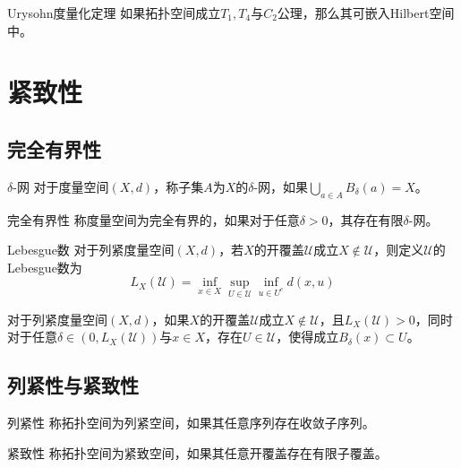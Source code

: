 \documentclass[lang = cn, scheme = chinese, thmcnt = section, usesamecnt]{elegantbook}
\newcommand{\sub}{\subset}             %
\begin{document}
\begin{theorem}{Urysohn度量化定理}
	如果拓扑空间成立$T_1,T_4$与$C_2$公理，那么其可嵌入Hilbert空间中。
\end{theorem}

\section{紧致性}

\subsection{完全有界性}

\begin{definition}{$\delta$-网}
	对于度量空间$(X,d)$，称子集$A$为$X$的$\delta$-网，如果$\displaystyle\bigcup_{a\in A}B_\delta(a)=X$。
\end{definition}

\begin{definition}{完全有界性}
	称度量空间为完全有界的，如果对于任意$\delta>0$，其存在有限$\delta$-网。
\end{definition}

\begin{definition}{Lebesgue数}
	对于列紧度量空间$(X,d)$，若$X$的开覆盖$\mathscr{U}$成立$X\notin \mathscr{U}$，则定义$\mathscr{U}$的Lebesgue数为%
	$$
	L_X(\mathscr{U})=\inf_{x\in X}\sup_{U\in\mathscr{U}}\inf_{u\in U^c}d(x,u)
	$$
\end{definition}

\begin{proposition}
	对于列紧度量空间$(X,d)$，如果$X$的开覆盖$\mathscr{U}$成立$X\notin \mathscr{U}$，且$L_X(\mathscr{U})>0$，同时对于任意$\delta\in(0,L_X(\mathscr{U}))$与$x\in X$，存在$U\in\mathscr{U}$，使得成立$B_\delta(x)\sub U$。
\end{proposition}

\subsection{列紧性与紧致性}

\begin{definition}{列紧性}
	称拓扑空间为列紧空间，如果其任意序列存在收敛子序列。
\end{definition}

\begin{definition}{紧致性}
	称拓扑空间为紧致空间，如果其任意开覆盖存在有限子覆盖。
\end{definition}
\end{document}
